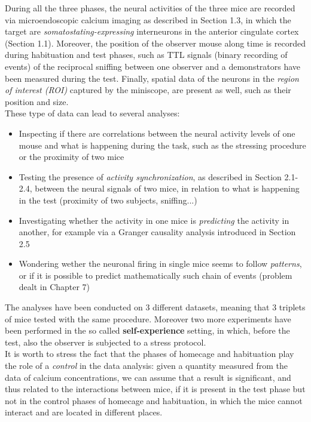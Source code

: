 \documentclass[a4paper]{article}
\begin{document}
During all the three phases, the neural activities of the three mice are recorded via microendoscopic calcium imaging as described in Section 1.3, in which the target are \textit{somatostating-expressing} interneurons in the anterior cingulate cortex (Section 1.1). Moreover, the position of the observer mouse along time is recorded during habituation and test phases, such as TTL signals (binary recording of events) of the reciprocal sniffing between one observer and a demonstrators have been measured during the test. Finally, spatial data of the neurons in the \textit{region of interest (ROI)} captured by the miniscope, are present as well, such as their position and size.\\
These type of data can lead to several analyses:
\begin{itemize}
	
	\item Inspecting if there are correlations between the neural activity levels of one mouse and what is happening during the task, such as the stressing procedure or the proximity of two mice
	
	\item Testing the presence of \textit{activity synchronization}, as described in Section 2.1-2.4, between the neural signals of two mice, in relation to what is happening in the test (proximity of two subjects, sniffing...)
	
	\item Investigating whether the activity in one mice is \textit{predicting} the activity in another, for example via a Granger causality analysis introduced in Section 2.5
	
	\item Wondering wether the neuronal firing in single mice seems to follow \textit{patterns}, or if it is possible to predict mathematically such chain of events (problem dealt in Chapter 7)
\end{itemize}


The analyses have been conducted on 3 different datasets, meaning that 3 triplets of mice tested with the same procedure. Moreover two more experiments have been performed in the so called \textbf{self-experience} setting, in which, before the test, also the observer is subjected to a stress protocol.\\
It is worth to stress the fact that the phases of homecage and habituation play the role of a \textit{control} in the data analysis: given a quantity measured from the data of calcium concentrations, we can assume that a result is significant, and thus related to the interactions between mice, if it is present in the test phase but not in the control phases of homecage and habituation, in which the mice cannot interact and are located in different places.
\end{document}

